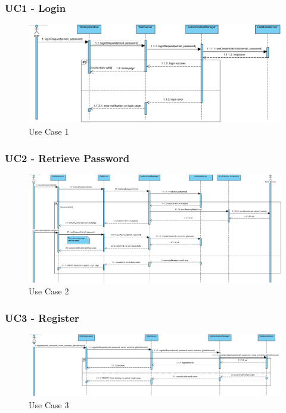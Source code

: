 \documentclass{article}
\begin{document}
\subsubsection*{UC1 - Login}

\begin{figure}[H]
    \centering
    \includegraphics[width=1\textwidth]{images/UseCaseSequenceDiagrams/UC1}
    \caption{Use Case 1}
    \label{fig:UC1}
\end{figure}

\subsubsection*{UC2 - Retrieve Password}

\begin{figure}[H]
    \centering
    \includegraphics[width=1\textwidth]{images/UseCaseSequenceDiagrams/UC2}
    \caption{Use Case 2}
    \label{fig:UC2}
\end{figure}

\subsubsection*{UC3 - Register}

\begin{figure}[H]
    \centering
    \includegraphics[width=1\textwidth]{images/UseCaseSequenceDiagrams/UC3}
    \caption{Use Case 3}
    \label{fig:UC3}
\end{figure}
\end{document}
